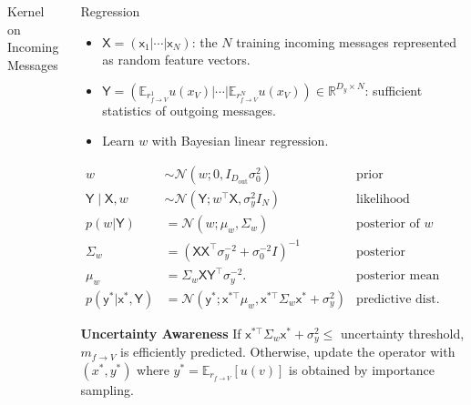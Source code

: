 \documentclass[english]{beamer}
\newcommand{\factor}{f}				%
\newcommand{\outV}{V}                         %
\begin{document}
\begin{frame}
\begin{columns}[t]
\begin{block}{Kernel on Incoming Messages}
\end{block}


\begin{block}{Regression}
\begin{itemize}
    \item $\mathsf{X}=\left(\mathsf{x}_{1}|\cdots|\mathsf{x}_{N}\right)$: 
        the $N$ training incoming messages represented as random feature vectors.
    \item $\mathsf{Y}=\left(\mathbb{E}_{r_{\factor\rightarrow
        \outV}^{1}}u(x_{\outV})|\cdots|\mathbb{E}_{r_{f\rightarrow
        \outV}^{N}}u(x_{\outV})\right)\in\mathbb{R}^{D_{y}\times N}$: 
        sufficient statistics of outgoing messages.
    \item Learn $w$ with Bayesian linear regression.
\end{itemize}

%
\small
\begin{align*}
    w & \sim\mathcal{N}\left(w;0,I_{D_\mathrm{out}}\sigma_{0}^{2}\right) & \text{prior}  \\
    \mathsf{Y} \mid \mathsf{X},w & \sim\mathcal{N}\left(\mathsf{Y};w^{\top}
    \mathsf{X},\sigma_{y}^{2}I_{N}\right) & \text{likelihood}\\
%
    p(w | \mathsf{Y}) & =\mathcal{N}(w;\mu_{w},\Sigma_{w}) & \text{posterior of } w \\
    \Sigma_{w} & = \left( \mathsf{X}
    \mathsf{X}^{\top}\sigma_{y}^{-2}+\sigma_{0}^{-2}I \right)^{-1} 
    & \text{posterior covariance}\\
    \mu_{w} & =\Sigma_{w} \mathsf{X} \mathsf{Y}^{\top}\sigma_{y}^{-2}. 
    & \text{posterior mean }\\
    p(\mathsf{y}^{*}| \mathsf{x}^{*}, \mathsf{Y}) 
    & =\mathcal{N}\left(\mathsf{y}^{*}; \mathsf{x}^{*\top}\mu_{w},
    \mathsf{x}^{*\top}\Sigma_{w} \mathsf{x}^{*}+\sigma_{y}^{2}\right)
    & \text{predictive dist.}
\end{align*}

\textbf{Uncertainty Awareness}
If $\mathsf{x}^{*\top}\Sigma_{w} \mathsf{x}^{*}+\sigma_{y}^{2} \leq $
uncertainty threshold, $m_{f \rightarrow V}$ is efficiently predicted.
Otherwise, update the operator with $(x^*, y^*)$ where $y^* =\mathbb{E}_{r_{f
\rightarrow V}}[u(v)] $ is obtained by importance sampling.


\end{block}
\end{columns}
\end{frame}
\end{document}
